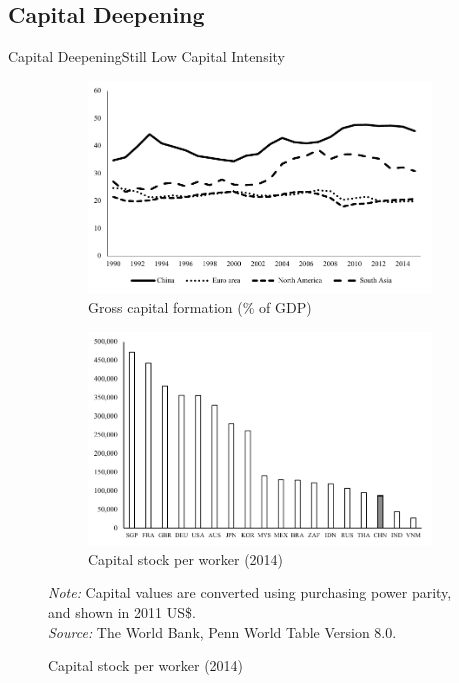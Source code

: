 \documentclass{beamer}
\begin{document}
\subsection{Capital Deepening}
\begin{frame}{Capital Deepening}{Still Low Capital Intensity}
\begin{figure}
\centering
\begin{subfigure}{.5\textwidth}
\centering
\includegraphics[scale=.45]{fig/invest.pdf}
\caption{Gross capital formation (\% of GDP)}
\label{fig:invest}
\end{subfigure}%
\begin{subfigure}{.5\textwidth}
\centering
\includegraphics[scale=.45]{fig/capital-pc.pdf}
\caption{Capital stock per worker (2014)}
\label{fig:capital-pc}
\end{subfigure}
\tiny\raggedright 
\emph{Note:} 
Capital values are converted using purchasing power parity, and shown in 2011 US\$. \\
\emph{Source:}
The World Bank, Penn World Table Version 8.0.
\end{figure}    
\end{frame}
\end{document}
